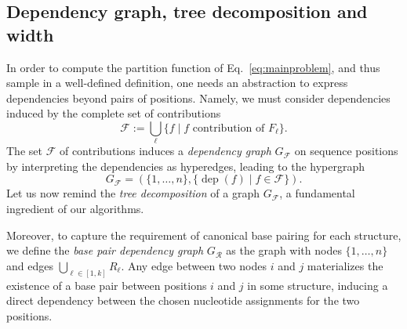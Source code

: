 \documentclass[]{bmcart}
\newcommand{\dep}{\operatorname{dep}}
\newcommand{\B}{\mathcal{B}}
\newcommand{\F}{\mathcal{F}}
\newcommand{\R}{\mathcal{R}}
\newcommand{\Def}[1]{\emph{#1}}
\newcommand{\Nuc}[1]{{\sf #1}}
\newcommand{\Ab}{\Nuc{A}}
\newcommand{\Cb}{\Nuc{C}}
\newcommand{\Gb}{\Nuc{G}}
\newcommand{\Ub}{\Nuc{U}}
\newcommand{\revised}[1]{{\color{red} #1}}
\begin{document}
\subsection*{Dependency graph, tree decomposition and width}



\revised{In order to compute the partition function of Eq.~\ref{eq:mainproblem}, and thus sample in a well-defined definition, one needs an abstraction to express dependencies beyond pairs of positions. 
Namely, we must consider dependencies induced by the complete set of contributions $$\F := \bigcup_{\ell}\{f\mid f\text{ contribution of } F_\ell\}.$$
%
%
The set $\F$ of contributions induces a
\Def{dependency graph} $G_\F$ on sequence positions by interpreting the dependencies as hyperedges, leading to the hypergraph 
$$G_\F=(\{1,\dots,n\} ,\{\dep(f)\mid f\in \F\}).$$ 
Let us now remind the \Def{tree decomposition} of a graph $G_\F$, a fundamental ingredient of our algorithms.}
 
Moreover, to capture the requirement of canonical base pairing for each structure,
we define the \Def{base pair dependency graph} $G_{\R}$ as the graph with nodes $\{1,\dots,n\}$
and edges $\bigcup_{\ell\in[1,k]} R_\ell$. Any edge between two nodes $i$ and $j$ materializes the existence of a base pair between positions $i$ and $j$ in some structure, inducing a direct dependency between the chosen nucleotide assignments for the two positions.
\end{document}
